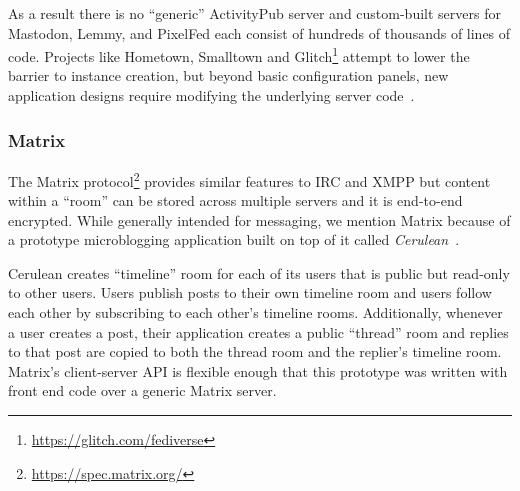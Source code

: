 As a result there is no ``generic'' ActivityPub server
and custom-built servers
for Mastodon, Lemmy, and PixelFed each consist of hundreds
of thousands of lines of code.
Projects like Hometown, Smalltown and Glitch\footnote{
    \url{https://glitch.com/fediverse}
} attempt to lower the barrier
to instance creation, but beyond basic configuration panels,
new application designs require modifying the underlying server code~\cite{smalltown,runyourownsocial}.




\subsubsection{Matrix}

The Matrix protocol\footnote{
    \url{https://spec.matrix.org/}
}
provides similar features to IRC and XMPP but content within a ``room''
can be stored across multiple servers and it is end-to-end encrypted.
While generally intended for messaging, we mention Matrix because of a
prototype microblogging application built on top of it called \emph{Cerulean}~\cite{cerulean}.

Cerulean creates ``timeline'' room for each of its users
that is public but read-only
to other users. Users publish posts to their own timeline room
and users follow each other by subscribing to each other's timeline rooms.
Additionally, whenever a user creates a post, their application creates a
public ``thread'' room and replies to that post are copied to both the
thread room and the replier's timeline room.
Matrix's client-server API is flexible enough that this prototype
was written with front end code over a generic Matrix server.

